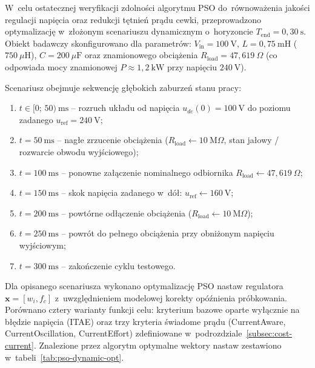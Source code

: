 W~celu ostatecznej weryfikacji zdolności algorytmu PSO do~równoważenia jakości regulacji napięcia oraz redukcji tętnień prądu cewki, przeprowadzono optymalizację w~złożonym scenariuszu dynamicznym o~horyzoncie $T_{\mathrm{end}} = 0{,}30~\mathrm{s}$. Obiekt badawczy skonfigurowano dla parametrów: $V_{\mathrm{in}} = 100~\mathrm{V}$, $L = 0{,}75~\mathrm{mH}$ ($750~\mu\mathrm{H}$), $C = 200~\mu\mathrm{F}$ oraz znamionowego obciążenia $R_{\mathrm{load}} = 47{,}619~\Omega$ (co odpowiada mocy znamionowej $P \approx 1{,}2~\mathrm{kW}$ przy napięciu $240~\mathrm{V}$).

Scenariusz obejmuje sekwencję głębokich zaburzeń stanu pracy:
\begin{enumerate}
    \item $t \in [0;\, 50)~\mathrm{ms}$ -- rozruch układu od napięcia $u_{dc}(0) = 100~\mathrm{V}$ do poziomu zadanego $u_{\mathrm{ref}} = 240~\mathrm{V}$;
    \item $t = 50~\mathrm{ms}$ -- nagłe zrzucenie obciążenia ($R_{\mathrm{load}} \leftarrow 10~\mathrm{M}\Omega$, stan jałowy / rozwarcie obwodu wyjściowego);
    \item $t = 100~\mathrm{ms}$ -- ponowne załączenie nominalnego odbiornika $R_{\mathrm{load}} \leftarrow 47{,}619~\Omega$;
    \item $t = 150~\mathrm{ms}$ -- skok napięcia zadanego w~dół: $u_{\mathrm{ref}} \leftarrow 160~\mathrm{V}$;
    \item $t = 200~\mathrm{ms}$ -- powtórne odłączenie obciążenia ($R_{\mathrm{load}} \leftarrow 10~\mathrm{M}\Omega$);
    \item $t = 250~\mathrm{ms}$ -- powrót do pełnego obciążenia przy obniżonym napięciu wyjściowym;
    \item $t = 300~\mathrm{ms}$ -- zakończenie cyklu testowego.
\end{enumerate}

Dla opisanego scenariusza wykonano optymalizację PSO nastaw regulatora $\mathbf{x} = [w_i, f_c]$ z~uwzględnieniem modelowej korekty opóźnienia próbkowania. Porównano cztery warianty funkcji celu: kryterium bazowe oparte wyłącznie na błędzie napięcia (ITAE) oraz trzy kryteria świadome prądu (CurrentAware, CurrentOscillation, CurrentEffort) zdefiniowane w~podrozdziale~\ref{subsec:cost-current}. Znalezione przez algorytm optymalne wektory nastaw zestawiono w~tabeli~\ref{tab:pso-dynamic-opt}.

